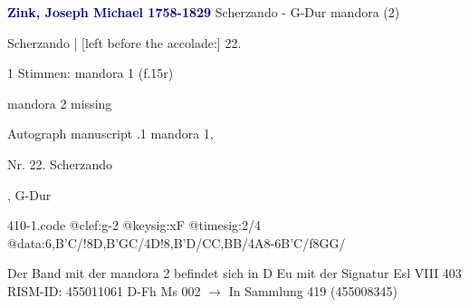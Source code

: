 \documentclass[twocolumn]{book}
\begin{document}
\newline \par \vspace{7pt} \textcolor{darkblue}{\textbf{Zink, Joseph Michael  1758-1829}}
\newline Scherzando - G-Dur
\newline mandora (2)
\newline \begin{itshape}[f.15r, at left:] Scherzando | [left before the accolade:] 22.\end{itshape} 
\newline \textcolor{darkblue}{}  1 Stimmen: mandora 1  (f.15r)
\newline \begin{small} mandora 2 missing\end{small} 
\newline Autograph manuscript
.1  mandora 1, \begin{itshape}Nr. 22. Scherzando\end{itshape}, G-Dur  
\begin{filecontents*}{410-1.code}
@clef:g-2
@keysig:xF
@timesig:2/4
@data:{6,B'C}/!8D,B'GC/4D!8,B'D/CC,BB/4A8-{6B'C}/f{8GG}/
\end{filecontents*}
\newline
%
\newline Der Band mit der mandora 2 befindet sich in D Eu mit der Signatur Esl VIII 403
\newline RISM-ID: 455011061
\newline D-Fh  Ms 002
\newline $\rightarrow$ In Sammlung 419 (455008345)
      
\end{document}
